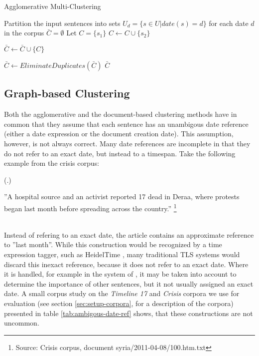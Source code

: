 \documentclass[a4paper,BCOR=10mm]{report}
\newcounter{quotecount}[chapter]
\newcommand{\countquote}[1]{\vspace{1cm}\refstepcounter{quotecount}%
     (\thechapter.\arabic{quotecount}) \hspace*{1cm} \parbox{9cm}{#1}\\[1cm]}
\numberwithin{lemma}{chapter}
\numberwithin{definition}{chapter}
\begin{document}
 \begin{algorithm}
 \caption{Agglomerative Multi-Clustering}
 \label{alg:multi-clustering}
 \begin{algorithmic}
    \STATE Partition the input sentences into sets $U_d = \{ s \in U | date(s) = d \}$ for each date $d$ in the corpus
    \STATE $\bar{C} = \emptyset$
            \STATE Let $C = \{  s_1 \}$
                    \STATE $C \leftarrow C \cup \{ s_2 \}$
                \ENDIF
            \ENDFOR

                \STATE $\bar{C} \leftarrow \bar{C} \cup \{ C \}$
            \ENDIF
        \ENDFOR

    \ENDFOR
    \STATE $\bar{C} \leftarrow \mathit{EliminateDuplicates}(\bar{C})$
    \RETURN $\bar{C}$

\end{algorithmic}
\end{algorithm}


\subsection{Graph-based Clustering}

Both the agglomerative and the document-based clustering methods have in common that they assume that each sentence has an unambigous date reference (either a date expression or the document creation date).
This assumption, however, is not always correct. Many date references are incomplete in that they do not refer to an exact date, but instead to a timespan. Take the following example from the crisis corpus:

\countquote{
''A hospital source and an activist reported 17 dead in Deraa, where protests began last month before spreading across the country.'' \footnote{Source: Crisis corpus, document syria/2011-04-08/100.htm.txt}
\label{quot:hospital}
}
Instead of refering to an exact date, the article contains an approximate reference to ''last month''. While this construction would be recognized by a time expression tagger, such as HeidelTime \citep{heideltime}, many traditional TLS systems would discard this inexact reference, because it does not refer to an exact date.
Where it is handled, for example in the system of \citet{chieu}, it may be taken into account to determine the importance of other sentences, but it not usually assigned an exact date.
A small corpus study on the \textit{Timeline 17} and \textit{Crisis} corpora we use for evaluation (see section \ref{sec:setup-corpora}, for a description of the corpora) presented in table \ref{tab:ambigous-date-ref} shows, that these constructions are not uncommon.
\end{document}
